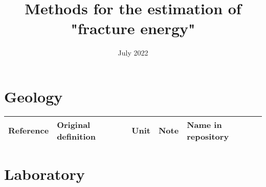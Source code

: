 \documentclass{article}
\title{Methods for the estimation of "fracture energy"}
\date{July 2022}
\begin{document}
\maketitle

\section{Geology}
\begin{longtable}{|p{4 cm}|p{8 cm}|p{1.25 cm}|p{1.25 cm}|p{1.5 cm}|}
\hline
\textbf{Reference} & \textbf{Original definition} & \textbf{Unit} & \textbf{Note} & \textbf{Name in repository} \\ \hline

\hline
\end{longtable}

\section{Laboratory}
\end{document}
